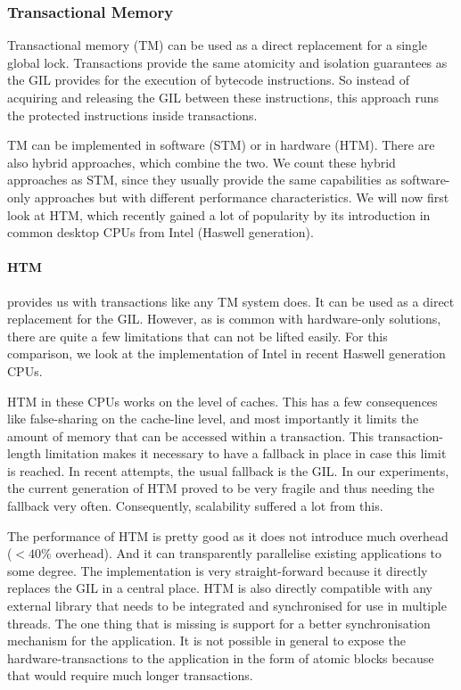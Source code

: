 \documentclass{sigplanconf}
\begin{document}


\subsubsection{Transactional Memory}
Transactional memory (TM) can be used as a direct replacement for a
single global lock. Transactions provide the same atomicity and
isolation guarantees as the GIL provides for the execution of bytecode
instructions. So instead of acquiring and releasing the GIL between
these instructions, this approach runs the protected instructions
inside transactions.

TM can be implemented in software (STM) or in hardware (HTM). There
are also hybrid approaches, which combine the two. We count these
hybrid approaches as STM, since they usually provide the same
capabilities as software-only approaches but with different
performance characteristics. We will now first look at HTM, which
recently gained a lot of popularity by its introduction in common
desktop CPUs from Intel (Haswell generation).

\paragraph{HTM} provides us with transactions like any TM system does.
It can be used as a direct replacement for the GIL\cite{nicholas06,odaira14,fuad10}. However, as is
common with hardware-only solutions, there are quite a few limitations
that can not be lifted easily. For this comparison, we look at the
implementation of Intel in recent Haswell generation CPUs.

HTM in these CPUs works on the level of caches. This has a few
consequences like false-sharing on the cache-line level, and most
importantly it limits the amount of memory that can be accessed within
a transaction. This transaction-length limitation makes it necessary
to have a fallback in place in case this limit is reached. In recent
attempts, the usual fallback is the GIL\cite{odaira14,fuad10}. In our
experiments, the current generation of HTM proved to be very fragile
and thus needing the fallback very often. Consequently, scalability
suffered a lot from this.

The performance of HTM is pretty good as it does not introduce much
overhead ($<40\%$ overhead\cite{odaira14}). And it can transparently
parallelise existing applications to some degree. The implementation
is very straight-forward because it directly replaces the GIL in a
central place. HTM is also directly compatible with any external
library that needs to be integrated and synchronised for use in
multiple threads. The one thing that is missing is support for a
better synchronisation mechanism for the application. It is not
possible in general to expose the hardware-transactions to the
application in the form of atomic blocks because that would require
much longer transactions.
\end{document}
